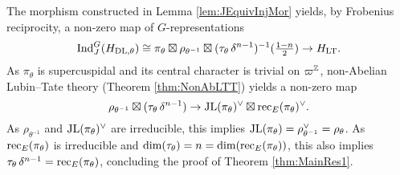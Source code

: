 \documentclass[../main.tex]{subfiles}
\begin{document}
The morphism constructed in Lemma \ref{lem:JEquivInjMor} yields, by Frobenius
reciprocity, a non-zero map of $G$-representations
\begin{equation} \label{eq:WantedMap}
  \mathrm{Ind}_{J}^G (H_{\mathrm{DL},\theta}) \cong \pi_\theta \boxtimes \rho_{\theta^{-1}}
  \boxtimes (\tau_\theta \, \delta^{n-1})^{-1}(\tfrac{1-n}2) \to H_{\mathrm{LT}}.
\end{equation}
As $\pi_\theta$ is supercuspidal and its central character is trivial on 
$\varpi^{\mathbb{Z}}$, non-Abelian Lubin--Tate theory (Theorem \ref{thm:NonAbLTT}) yields a non-zero map
\begin{equation*}
  \rho_{\theta^{-1}} \boxtimes (\tau_\theta \, \delta^{n-1}) \to
  \mathrm{JL}(\pi_\theta)^\vee \boxtimes \mathrm{rec}_E(\pi_\theta)^\vee.
\end{equation*}
As $\rho_{\theta^{-1}}$ and $\mathrm{JL}(\pi_\theta)^\vee$ are irreducible, this implies
$\mathrm{JL}(\pi_\theta) = \rho_{\theta^{-1}}^\vee = \rho_\theta$. As 
$\mathrm{rec}_E(\pi_\theta)$ is irreducible and $\dim(\tau_\theta) = n = \dim
(\mathrm{rec}_E(\pi_\theta))$, this also implies $\tau_\theta \, \delta^{n-1} =
\mathrm{rec}_E(\pi_\theta)$, concluding the proof of Theorem \ref{thm:MainRes1}.


\end{document}
